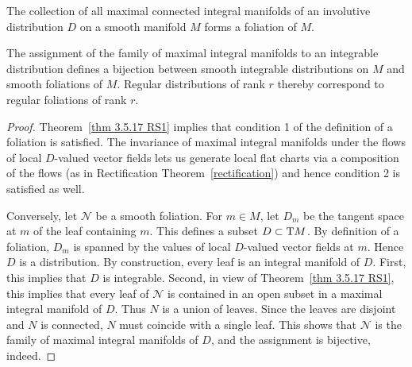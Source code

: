\begin{thm}\label{prop 3.5.21 RS1}
    The collection of all maximal connected integral manifolds of an involutive distribution $D$ on a smooth manifold $M$ forms a foliation of $M$.
    
    The assignment of the family of maximal integral manifolds to an integrable distribution defines a bijection between smooth integrable distributions on $M$ and smooth foliations of $M$. Regular distributions of rank $r$ thereby correspond to regular foliations of rank $r$.
\end{thm}
\begin{proof}
    Theorem~\ref{thm 3.5.17 RS1} implies that condition 1 of the definition of a foliation is satisfied. The invariance of maximal integral manifolds under the flows of local $D$-valued vector fields lets us generate local flat charts via a composition of the flows (as in Rectification Theorem~\ref{rectification}) and hence condition 2 is satisfied as well. 

    Conversely, let $\mathcal{N}$ be a smooth foliation. For $m\in M$, let $D_m$ be the tangent space at $m$ of the leaf containing $m$. This defines a subset $D\subset \mathrm{T} M$. By definition of a foliation, $D_m$ is spanned by the values of local $D$-valued vector fields at $m$. Hence $D$ is a distribution. By construction, every leaf is an integral manifold of $D$. First, this implies that $D$ is integrable. Second, in view of Theorem~\ref{thm 3.5.17 RS1}, this implies that every leaf of $\mathcal{N}$ is contained in an open subset in a maximal integral manifold of $D$. Thus $N$ is a union of leaves. Since the leaves are disjoint and $N$ is connected, $N$ must coincide with a single leaf. This shows that $\mathcal{N}$ is the family of maximal integral manifolds of $D$, and the assignment is bijective, indeed.
\end{proof}



